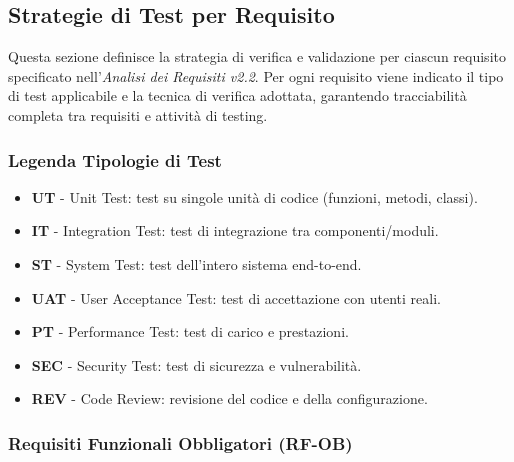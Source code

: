 \documentclass[a4paper,11pt,oneside]{scrartcl}
\begin{document}
\subsection{Strategie di Test per Requisito}

Questa sezione definisce la strategia di verifica e validazione per ciascun requisito specificato nell'\textit{Analisi dei Requisiti v2.2}. Per ogni requisito viene indicato il tipo di test applicabile e la tecnica di verifica adottata, garantendo tracciabilità completa tra requisiti e attività di testing{\scriptsize{}}.

\subsubsection{Legenda Tipologie di Test}

\begin{itemize}[leftmargin=1.5cm]
    \item \textbf{UT} - Unit Test: test su singole unità di codice (funzioni, metodi, classi).
    \item \textbf{IT} - Integration Test: test di integrazione tra componenti/moduli.
    \item \textbf{ST} - System Test: test dell'intero sistema end-to-end.
    \item \textbf{UAT} - User Acceptance Test: test di accettazione con utenti reali.
    \item \textbf{PT} - Performance Test: test di carico e prestazioni.
    \item \textbf{SEC} - Security Test: test di sicurezza e vulnerabilità.
    \item \textbf{REV} - Code Review: revisione del codice e della configurazione.
\end{itemize}


\subsubsection{Requisiti Funzionali Obbligatori (RF-OB)}
\end{document}
